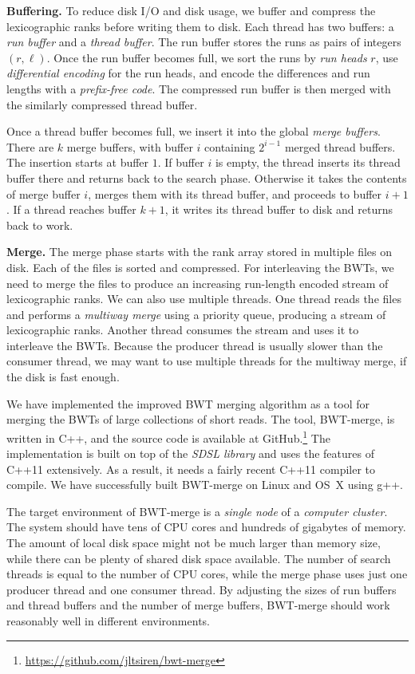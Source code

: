 \documentclass[smallabstract,smallcaptions]{dccpaper}
\newcommand{\BWT}{\textsf{BWT}}
\newcommand{\BWTmerge}{\textsf{BWT\nobreakdash-merge}}
\begin{document}
\smallbreak\noindent\textbf{Buffering.} To reduce disk I/O and disk usage, we buffer and compress the lexicographic ranks before writing them to disk. Each thread has two buffers: a \emph{run buffer} and a \emph{thread buffer}. The run buffer stores the runs as pairs of integers $(r, \ell)$. Once the run buffer becomes full, we sort the runs by \emph{run heads} $r$, use \emph{differential encoding} for the run heads, and encode the differences and run lengths with a \emph{prefix-free code}. The compressed run buffer is then merged with the similarly compressed thread buffer.

Once a thread buffer becomes full, we insert it into the global \emph{merge buffers}. There are $k$ merge buffers, with buffer $i$ containing $2^{i-1}$ merged thread buffers. The insertion starts at buffer $1$. If buffer $i$ is empty, the thread inserts its thread buffer there and returns back to the search phase. Otherwise it takes the contents of merge buffer $i$, merges them with its thread buffer, and proceeds to buffer $i+1$. If a thread reaches buffer $k+1$, it writes its thread buffer to disk and returns back to work.

\smallbreak\noindent\textbf{Merge.} The merge phase starts with the rank array stored in multiple files on disk. Each of the files is sorted and compressed. For interleaving the \BWT{}s, we need to merge the files to produce an increasing run-length encoded stream of lexicographic ranks. We can also use multiple threads. One thread reads the files and performs a \emph{multiway merge} using a priority queue, producing a stream of lexicographic ranks. Another thread consumes the stream and uses it to interleave the \BWT{}s. Because the producer thread is usually slower than the consumer thread, we may want to use multiple threads for the multiway merge, if the disk is fast enough.



We have implemented the improved \BWT{} merging algorithm as a tool for merging the \BWT{}s of large collections of short reads. The tool, \BWTmerge{}, is written in C++, and the source code is available at GitHub.\footnote{\url{https://github.com/jltsiren/bwt-merge}} The implementation is built on top of the \emph{SDSL library} \cite{Gog2014b} and uses the features of C++11 extensively. As a result, it needs a fairly recent C++11 compiler to compile. We have successfully built \BWTmerge{} on Linux and OS~X using g++.

The target environment of \BWTmerge{} is a \emph{single node} of a \emph{computer cluster}. The system should have tens of CPU cores and hundreds of gigabytes of memory. The amount of local disk space might not be much larger than memory size, while there can be plenty of shared disk space available. The number of search threads is equal to the number of CPU cores, while the merge phase uses just one producer thread and one consumer thread. By adjusting the sizes of run buffers and thread buffers and the number of merge buffers, \BWTmerge{} should work reasonably well in different environments.
\end{document}

